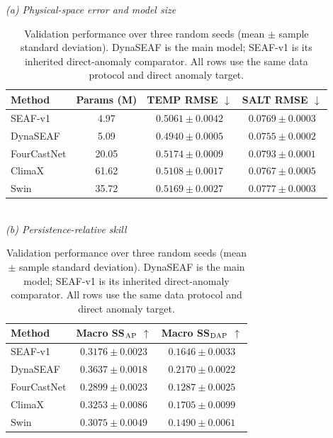 \documentclass[conference]{IEEEtran}
\begin{document}
\begin{table}[!t]
\centering
\caption{Validation performance over three random seeds (mean $\pm$ sample standard deviation). DynaSEAF is the main model; SEAF-v1 is its inherited direct-anomaly comparator. All rows use the same data protocol and direct anomaly target.}
\label{tab:validation_main}
\scriptsize
\setlength{\tabcolsep}{3.0pt}
\renewcommand{\arraystretch}{1.05}
\textit{(a) Physical-space error and model size}\\[2pt]
\begin{tabular}{lccc}
\toprule
Method & Params (M) & TEMP RMSE $\downarrow$ & SALT RMSE $\downarrow$\\
\midrule
\rowcolor{seafblue} SEAF-v1 & 4.97 & $0.5061\!\pm\!0.0042$ & $0.0769\!\pm\!0.0003$\\
DynaSEAF & 5.09 & $\mathbf{0.4940\!\pm\!0.0005}$ & $\mathbf{0.0755\!\pm\!0.0002}$\\
FourCastNet & 20.05 & $0.5174\!\pm\!0.0009$ & $0.0793\!\pm\!0.0001$\\
ClimaX & 61.62 & $0.5108\!\pm\!0.0017$ & $\mathbf{0.0767\!\pm\!0.0005}$\\
Swin & 35.72 & $0.5169\!\pm\!0.0027$ & $0.0777\!\pm\!0.0003$\\
\bottomrule
\end{tabular}\\[4pt]
\textit{(b) Persistence-relative skill}\\[2pt]
\begin{tabular}{lcc}
\toprule
Method & Macro SS$_{\rm AP}$ $\uparrow$ & Macro SS$_{\rm DAP}$ $\uparrow$\\
\midrule
\rowcolor{seafblue} SEAF-v1 & $0.3176\!\pm\!0.0023$ & $0.1646\!\pm\!0.0033$\\
DynaSEAF & $\mathbf{0.3637\!\pm\!0.0018}$ & $\mathbf{0.2170\!\pm\!0.0022}$\\
FourCastNet & $0.2899\!\pm\!0.0023$ & $0.1287\!\pm\!0.0025$\\
ClimaX & $\mathbf{0.3253\!\pm\!0.0086}$ & $\mathbf{0.1705\!\pm\!0.0099}$\\
Swin & $0.3075\!\pm\!0.0049$ & $0.1490\!\pm\!0.0061$\\
\bottomrule
\end{tabular}
\end{table}
\end{document}
